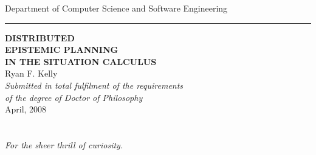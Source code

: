 %
%
%
%





\begin{titlepage}
\begin{center}
{\Large Department of Computer Science and Software Engineering}\\ \vspace{0.1cm}
\rule{150mm}{0.5mm}

\vspace{1cm}
{\bf\LARGE  DISTRIBUTED }\\ \vspace{0.3cm} %
{\bf\LARGE  EPISTEMIC PLANNING }\\ \vspace{0.3cm} %
{\bf\LARGE  IN THE SITUATION CALCULUS } \\ %
\vspace{2cm}
{\LARGE      Ryan F. Kelly       }\\
\vspace{5cm}
{\em\large Submitted in total fulfilment of the requirements}\\ \vspace{0.1cm}
{\em\large        of the degree of Doctor of Philosophy     }\\
\vspace{0.5cm}
{\Large             April, 2008        }\\
\vspace{0.5cm}
\end{center}
\end{titlepage}

\chapter*{ } %
\begin{center}
\emph{For the sheer thrill of curiosity.}
\end{center}





